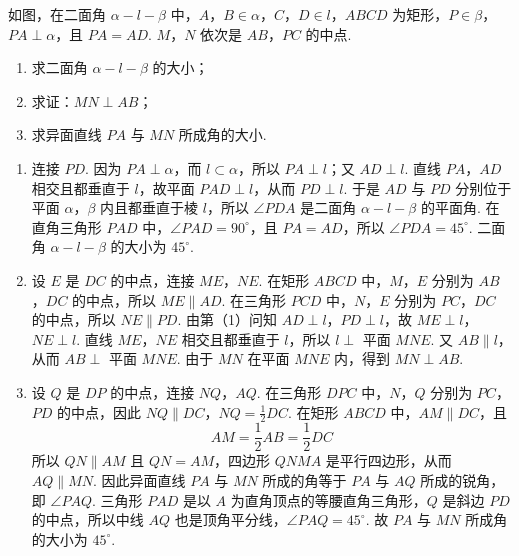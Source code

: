 \documentclass[UTF8,a4paper,oneside,11pt]{ctexbook}
\begin{document}
\begin{problem}
如图，在二面角 \(\alpha-l-\beta\) 中，\(A\)，\(B\in\alpha\)，\(C\)，\(D\in l\)，\(ABCD\) 为矩形，\(P\in\beta\)，\(PA\perp\alpha\)，且 \(PA=AD\). \(M\)，\(N\) 依次是 \(AB\)，\(PC\) 的中点.

\begin{enumerate}
\item 求二面角 \(\alpha-l-\beta\) 的大小；
\item 求证：\(MN\perp AB\)；
\item 求异面直线 \(PA\) 与 \(MN\) 所成角的大小.
\end{enumerate}

\end{problem}

\begin{solution}
\begin{enumerate}
\item 连接 \(PD\). 因为 \(PA\perp\alpha\)，而 \(l\subset\alpha\)，所以 \(PA\perp l\)；又 \(AD\perp l\). 直线 \(PA\)，\(AD\) 相交且都垂直于 \(l\)，故平面 \(PAD\perp l\)，从而 \(PD\perp l\). 于是 \(AD\) 与 \(PD\) 分别位于平面 \(\alpha\)，\(\beta\) 内且都垂直于棱 \(l\)，所以 \(\angle PDA\) 是二面角 \(\alpha-l-\beta\) 的平面角. 在直角三角形 \(PAD\) 中，\(\angle PAD=90^\circ\)，且 \(PA=AD\)，所以 \(\angle PDA=45^\circ\). 二面角 \(\alpha-l-\beta\) 的大小为 \(45^\circ\).

\item 设 \(E\) 是 \(DC\) 的中点，连接 \(ME\)，\(NE\). 在矩形 \(ABCD\) 中，\(M\)，\(E\) 分别为 \(AB\)，\(DC\) 的中点，所以 \(ME\parallel AD\). 在三角形 \(PCD\) 中，\(N\)，\(E\) 分别为 \(PC\)，\(DC\) 的中点，所以 \(NE\parallel PD\). 由第（1）问知 \(AD\perp l\)，\(PD\perp l\)，故 \(ME\perp l\)，\(NE\perp l\). 直线 \(ME\)，\(NE\) 相交且都垂直于 \(l\)，所以 \(l\perp\) 平面 \(MNE\). 又 \(AB\parallel l\)，从而 \(AB\perp\) 平面 \(MNE\). 由于 \(MN\) 在平面 \(MNE\) 内，得到 \(MN\perp AB\).

\item 设 \(Q\) 是 \(DP\) 的中点，连接 \(NQ\)，\(AQ\). 在三角形 \(DPC\) 中，\(N\)，\(Q\) 分别为 \(PC\)，\(PD\) 的中点，因此
\(NQ\parallel DC\)，\(NQ=\frac{1}{2}DC\).
在矩形 \(ABCD\) 中，\(AM\parallel DC\)，且
\[
AM=\frac{1}{2}AB=\frac{1}{2}DC
\]
所以 \(QN\parallel AM\) 且 \(QN=AM\)，四边形 \(QNMA\) 是平行四边形，从而 \(AQ\parallel MN\). 因此异面直线 \(PA\) 与 \(MN\) 所成的角等于 \(PA\) 与 \(AQ\) 所成的锐角，即 \(\angle PAQ\). 三角形 \(PAD\) 是以 \(A\) 为直角顶点的等腰直角三角形，\(Q\) 是斜边 \(PD\) 的中点，所以中线 \(AQ\) 也是顶角平分线，\(\angle PAQ=45^\circ\). 故 \(PA\) 与 \(MN\) 所成角的大小为 \(45^\circ\).
\end{enumerate}
\end{solution}
\end{document}
